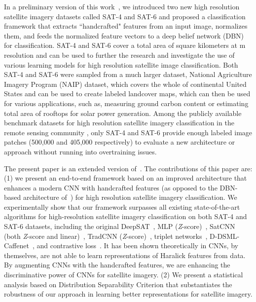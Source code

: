 \documentclass[]{interact}
\theoremstyle{plain}\newtheorem{theorem}{Theorem}[section]
\theoremstyle{definition}
\theoremstyle{remark}
\begin{document}
In a   preliminary version of this work~\citep{basu2015},
we introduced  two new high resolution satellite imagery datasets called SAT-4 and SAT-6 and proposed a classification framework that extracts ``handcrafted" features from an input image, normalizes them, and feeds the normalized feature vectors to a deep belief network (DBN) for classification. SAT-4 and SAT-6 cover a total area of  square kilometers at  m resolution  and  can be used to further the research and investigate the use of various learning models for high resolution satellite  image classification. Both SAT-4 and SAT-6 were sampled from a much larger dataset, National Agriculture Imagery Program (NAIP) dataset, which covers the whole of continental United States and can be used to create labeled landcover maps, which can then be used for various applications, such as, measuring ground carbon content or estimating total area of rooftops for solar power generation. Among the publicly available benchmark datasets for high resolution satellite imagery classification  in the remote sensing community \citep{ml}, only SAT-4 and SAT-6 provide enough labeled image patches (500,000 and 405,000 respectively) to evaluate a new architecture or approach without running into overtraining issues. 

The present paper is an extended version of~\citep{basu2015}. The contributions of this paper are: (1) we present an end-to-end framework based on an improved architecture that enhances  a modern CNN  with handcrafted features (as opposed to the DBN-based architecture of~\citep{basu2015}) for high resolution satellite imagery classification. We experimentally show that our framework surpasses  all existing state-of-the-art algorithms for high-resolution satellite imagery classification on both SAT-4 and SAT-6 datasets, including the original DeepSAT~\citep{basu2015}, MLP (\textit{Z}-score)~\citep{zhong2017satcnn}, SatCNN (both \textit{Z}-score and linear)~\citep{zhong2017satcnn}, TradCNN (\textit{Z}-score)~\citep{zhong2017satcnn}, triplet networks~\citep{liu2018scene}, D-DSML-Caffenet~\citep{gong2018diversity}, and contrastive loss~\citep{simo2015discriminative}. It has been shown theoretically in \citep{basujournal,basuijcnn} CNNs, by themselves, are not able to learn representations of  Haralick features from data.   By augmenting CNNs with the handcrafted features, we are enhancing the discriminative power of CNNs for satellite imagery. (2) We present a statistical analysis based on Distribution Separability Criterion  that substantiates the robustness of our approach in learning better representations for satellite imagery. 
\end{document}
